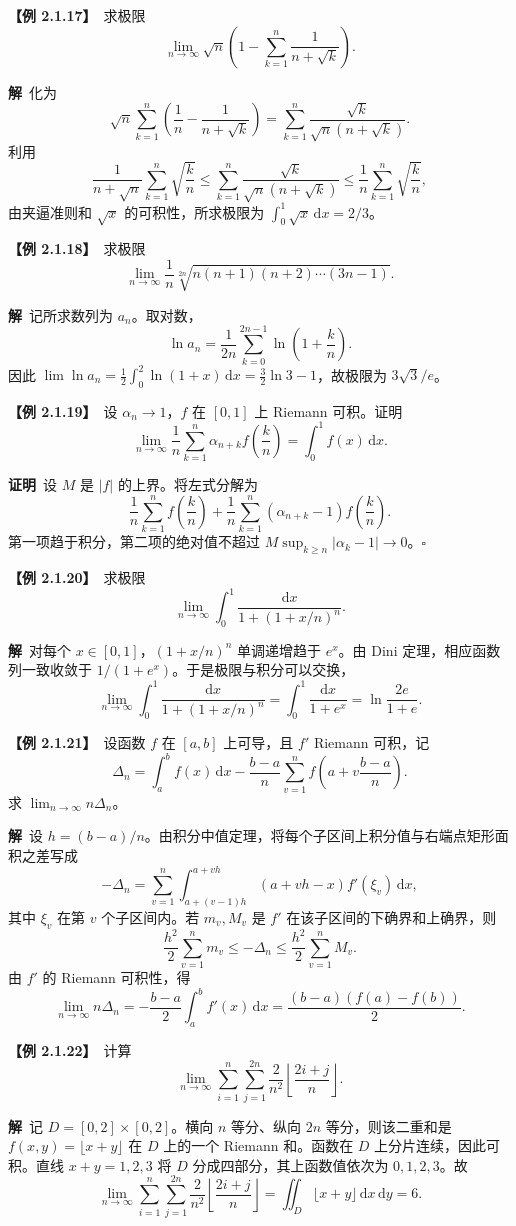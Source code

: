 \documentclass[UTF8,a4paper,11pt]{ctexart}
\newcommand{\ex}[1]{\par\medskip\noindent\textbf{【例 #1】}\ }
\newcommand{\pf}{\par\noindent\textbf{证明}\ }
\newcommand{\sol}{\par\noindent\textbf{解}\ }
\begin{document}
\ex{2.1.17}求极限
\[
\lim_{n\to\infty}\sqrt n\left(1-\sum_{k=1}^{n}\frac1{n+\sqrt k}\right).
\]
\sol 化为
\[
\sqrt n\sum_{k=1}^{n}\left(\frac1n-\frac1{n+\sqrt k}\right)
=\sum_{k=1}^{n}\frac{\sqrt k}{\sqrt n(n+\sqrt k)}.
\]
利用
\[
\frac1{n+\sqrt n}\sum_{k=1}^{n}\sqrt{\frac kn}
\le\sum_{k=1}^{n}\frac{\sqrt k}{\sqrt n(n+\sqrt k)}
\le\frac1n\sum_{k=1}^{n}\sqrt{\frac kn},
\]
由夹逼准则和 $\sqrt x$ 的可积性，所求极限为 $\int_0^1\sqrt x\,\mathrm dx=2/3$。

\ex{2.1.18}求极限
\[
\lim_{n\to\infty}\frac1n\sqrt[2n]{n(n+1)(n+2)\cdots(3n-1)}.
\]
\sol 记所求数列为 $a_n$。取对数，
\[
\ln a_n=\frac1{2n}\sum_{k=0}^{2n-1}\ln\!\left(1+\frac kn\right).
\]
因此 $\lim\ln a_n=\frac12\int_0^2\ln(1+x)\,\mathrm dx=\frac32\ln3-1$，故极限为 $3\sqrt3/e$。

\ex{2.1.19}设 $\alpha_n\to1$，$f$ 在 $[0,1]$ 上 Riemann 可积。证明
\[
\lim_{n\to\infty}\frac1n\sum_{k=1}^{n}\alpha_{n+k}f\!\left(\frac kn\right)
=\int_0^1f(x)\,\mathrm dx.
\]
\pf 设 $M$ 是 $|f|$ 的上界。将左式分解为
\[
\frac1n\sum_{k=1}^{n}f\!\left(\frac kn\right)
+\frac1n\sum_{k=1}^{n}(\alpha_{n+k}-1)f\!\left(\frac kn\right).
\]
第一项趋于积分，第二项的绝对值不超过 $M\sup_{k\ge n}|\alpha_k-1|\to0$。\hfill$\square$

\ex{2.1.20}求极限
\[
\lim_{n\to\infty}\int_0^1\frac{\mathrm dx}{1+(1+x/n)^n}.
\]
\sol 对每个 $x\in[0,1]$，$(1+x/n)^n$ 单调递增趋于 $e^x$。由 Dini 定理，相应函数列一致收敛于 $1/(1+e^x)$。于是极限与积分可以交换，
\[
\lim_{n\to\infty}\int_0^1\frac{\mathrm dx}{1+(1+x/n)^n}
=\int_0^1\frac{\mathrm dx}{1+e^x}
=\ln\frac{2e}{1+e}.
\]

\ex{2.1.21}设函数 $f$ 在 $[a,b]$ 上可导，且 $f'$ Riemann 可积，记
\[
\Delta_n=\int_a^bf(x)\,\mathrm dx
-\frac{b-a}{n}\sum_{v=1}^{n}f\!\left(a+v\frac{b-a}{n}\right).
\]
求 $\lim_{n\to\infty}n\Delta_n$。
\sol 设 $h=(b-a)/n$。由积分中值定理，将每个子区间上积分值与右端点矩形面积之差写成
\[
-\Delta_n=\sum_{v=1}^{n}\int_{a+(v-1)h}^{a+vh}
(a+vh-x)f'(\xi_v)\,\mathrm dx,
\]
其中 $\xi_v$ 在第 $v$ 个子区间内。若 $m_v,M_v$ 是 $f'$ 在该子区间的下确界和上确界，则
\[
\frac{h^2}{2}\sum_{v=1}^{n}m_v\le-\Delta_n\le\frac{h^2}{2}\sum_{v=1}^{n}M_v.
\]
由 $f'$ 的 Riemann 可积性，得
\[
\lim_{n\to\infty}n\Delta_n
=-\frac{b-a}{2}\int_a^bf'(x)\,\mathrm dx
=\frac{(b-a)(f(a)-f(b))}{2}.
\]

\ex{2.1.22}计算
\[
\lim_{n\to\infty}\sum_{i=1}^{n}\sum_{j=1}^{2n}
\frac2{n^2}\left\lfloor\frac{2i+j}{n}\right\rfloor.
\]
\sol 记 $D=[0,2]\times[0,2]$。横向 $n$ 等分、纵向 $2n$ 等分，则该二重和是 $f(x,y)=\lfloor x+y\rfloor$ 在 $D$ 上的一个 Riemann 和。函数在 $D$ 上分片连续，因此可积。直线 $x+y=1,2,3$ 将 $D$ 分成四部分，其上函数值依次为 $0,1,2,3$。故
\[
\lim_{n\to\infty}\sum_{i=1}^{n}\sum_{j=1}^{2n}
\frac2{n^2}\left\lfloor\frac{2i+j}{n}\right\rfloor
=\iint_D\lfloor x+y\rfloor\,\mathrm dx\,\mathrm dy=6.
\]
\end{document}
